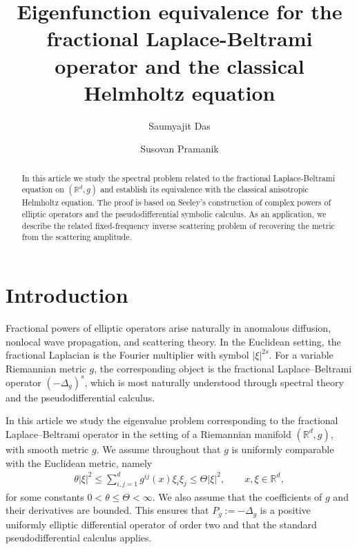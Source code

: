 \documentclass[12pt]{amsart}
\title[]{Eigenfunction equivalence for the fractional Laplace-Beltrami operator and the classical Helmholtz equation}
\author{Saumyajit Das}
\author{Susovan Pramanik}
\numberwithin{equation}{section}
\theoremstyle{definition}
\theoremstyle{remark}
\numberwithin{equation}{section}
\begin{document}
	
	
	
	\begin{abstract}
		In this article we study the spectral problem related to the fractional Laplace-Beltrami equation on
		$(\mathbb{R}^d,g)$ and establish its equivalence with
		the classical anisotropic Helmholtz equation.  The proof is based on
		Seeley's construction of complex powers of elliptic operators and the
		pseudodifferential symbolic calculus.  As an application, we describe the
		related fixed-frequency inverse scattering problem of recovering the metric
		from the scattering amplitude.
	\end{abstract}
	\maketitle
	
	\section{Introduction}
	
	Fractional powers of elliptic operators arise naturally in anomalous diffusion,
	nonlocal wave propagation, and scattering theory.  In the Euclidean setting,
	the fractional Laplacian is the Fourier multiplier with symbol $|\xi|^{2s}$.
	For a variable Riemannian metric $g$, the corresponding object is the
	fractional Laplace--Beltrami operator $(-\Delta_g)^s$, which is most naturally
	understood through spectral theory and the pseudodifferential calculus.
	
	
	
	In this article we study the eigenvalue problem corresponding to the fractional
	Laplace--Beltrami operator in the setting of a Riemannian manifold
	$(\mathbb{R}^d,g)$, with smooth metric $g$. We assume throughout that $g$ is
	uniformly comparable with the Euclidean metric, namely
	\begin{align}\label{uniform ellipticiy}
		\theta |\xi|^2 \leq \sum_{i,j=1}^d g^{ij}(x)\xi_i\xi_j\leq \Theta |\xi|^2,
		\qquad x,\xi\in\mathbb{R}^d,
	\end{align}
	for some constants $0<\theta\leq \Theta<\infty$. We also assume that the
	coefficients of $g$ and their derivatives are bounded. This ensures that
	$P_g:=-\Delta_g$ is a positive uniformly elliptic differential operator of
	order two and that the standard pseudodifferential calculus applies.
	
\end{document}
